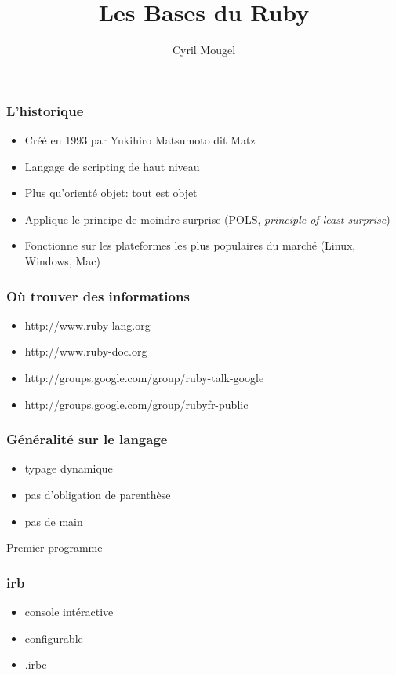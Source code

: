 \documentclass{beamer}
\title{Les Bases du Ruby}
\author{Cyril Mougel}
\begin{document}
\begin{frame}
  \titlepage
\end{frame}

\begin{frame}
	\frametitle{L'historique}
	\begin{itemize}
		\item Créé en 1993 par Yukihiro Matsumoto dit \og{}Matz\fg{}
		\item Langage de scripting de haut niveau
		\item Plus qu'orienté objet: tout est objet
        \item Applique le principe de moindre surprise (POLS, \emph{principle of
                least surprise})
        \item Fonctionne sur les plateformes les plus populaires du marché (Linux, Windows,
                Mac)
	\end{itemize}
\end{frame}

\begin{frame}
  \frametitle{Où trouver des informations}
  \begin{itemize}
    \item http://www.ruby-lang.org
    \item http://www.ruby-doc.org
    \item http://groups.google.com/group/ruby-talk-google
    \item http://groups.google.com/group/rubyfr-public
  \end{itemize}
\end{frame}

\begin{frame}
  \frametitle{G\'en\'eralit\'e sur le langage}
  \begin{itemize}
    \item typage dynamique
    \item pas d'obligation de parenthèse
    \item pas de main
  \end{itemize}
\end{frame}

\begin{frame}
  \begin{beamerboxesrounded}{Premier programme}
    
  \end{beamerboxesrounded}
\end{frame}

\begin{frame}
  \frametitle{irb}
  \begin{itemize}
    \item console intéractive
    \item configurable
    \item .irbc
  \end{itemize}
\end{frame}
\end{document}
